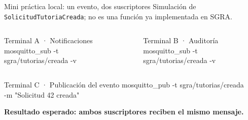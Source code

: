 \begin{frame}{Mini práctica local: un evento, dos suscriptores}
{\small\color{gris}Simulación de \texttt{SolicitudTutoriaCreada}; no es una función ya implementada en SGRA.}
\vspace{2.5mm}
\begin{columns}[T,onlytextwidth]
\begin{block}{Terminal A · Notificaciones}
{\footnotesize\ttfamily mosquitto\_sub -t\\ sgra/tutorias/creada -v}
\end{block}
\begin{block}{Terminal B · Auditoría}
{\footnotesize\ttfamily mosquitto\_sub -t\\ sgra/tutorias/creada -v}
\end{block}
\end{columns}
\vspace{3mm}
\begin{block}{Terminal C · Publicación del evento}
{\footnotesize\ttfamily mosquitto\_pub -t sgra/tutorias/creada\\ -m "Solicitud 42 creada"}
\end{block}
\begin{center}
{\small\color{turquesa}\bfseries Resultado esperado: ambos suscriptores reciben el mismo mensaje.}
\end{center}
\end{frame}


